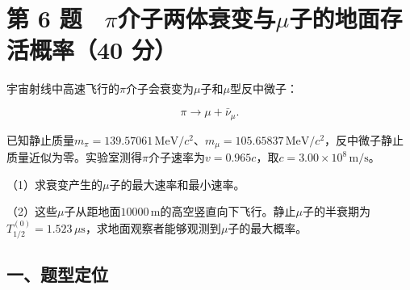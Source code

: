 \documentclass[12pt,a4paper,fontset=fandol]{ctexart}
\begin{document}
\section{\texorpdfstring{第 6
题　\(\pi\)介子两体衰变与\(\mu\)子的地面存活概率（40
分）}{第 6 题　\textbackslash pi介子两体衰变与\textbackslash mu子的地面存活概率（40 分）}}\label{ux7b2c-6-ux9898-piux4ecbux5b50ux4e24ux4f53ux8870ux53d8ux4e0emuux5b50ux7684ux5730ux9762ux5b58ux6d3bux6982ux738740-ux5206}

宇宙射线中高速飞行的\(\pi\)介子会衰变为\(\mu\)子和\(\mu\)型反中微子：

\[
\pi\longrightarrow\mu+\bar\nu_\mu.
\]

已知静止质量\(m_\pi=139.57061\,\mathrm{MeV}/c^2\)、\(m_\mu=105.65837\,\mathrm{MeV}/c^2\)，反中微子静止质量近似为零。实验室测得\(\pi\)介子速率为\(v=0.965c\)，取\(c=3.00\times10^8\,\mathrm{m/s}\)。

\begin{center}
\begin{minipage}{\linewidth}
\centering\begingroup{}
\ifdim\wd\diagrambox>.88\linewidth
\sbox{\diagrambox}{\resizebox{.88\linewidth}{!}{\usebox{\diagrambox}}}\fi
\ifdim\ht\diagrambox>.38\textheight
\resizebox{!}{.38\textheight}{\usebox{\diagrambox}}
\else\usebox{\diagrambox}\fi
\par{}\endgroup\end{minipage}\end{center}

（1）求衰变产生的\(\mu\)子的最大速率和最小速率。

（2）这些\(\mu\)子从距地面\(10000\,\mathrm m\)的高空竖直向下飞行。静止\(\mu\)子的半衰期为\(T_{1/2}^{(0)}=1.523\,\mu\mathrm s\)，求地面观察者能够观测到\(\mu\)子的最大概率。

\subsection{一、题型定位}\label{ux4e00ux9898ux578bux5b9aux4f4d-5}
\end{document}
